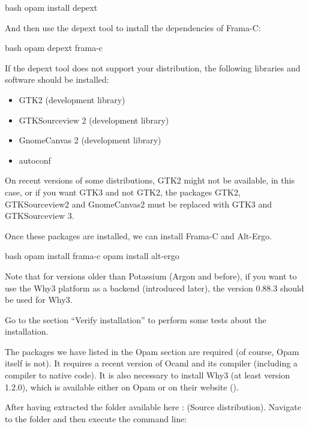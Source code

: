 \begin{CodeBlock}{bash}
opam install depext
\end{CodeBlock}


And then use the depext tool to install the dependencies of Frama-C:


\begin{CodeBlock}{bash}
opam depext frama-c
\end{CodeBlock}


If the depext tool does not support your distribution, the following
libraries and software should be installed:

\begin{itemize}
\item GTK2 (development library)
\item GTKSourceview 2 (development library)
\item GnomeCanvas 2 (development library)
\item autoconf
\end{itemize}

On recent versions of some distributions, GTK2 might not be available, in
this case, or if you want GTK3 and not GTK2, the packages GTK2, GTKSourceview2
and GnomeCanvas2 must be replaced with GTK3 and GTKSourceview 3.


Once these packages are installed, we can install Frama-C and Alt-Ergo.


\begin{CodeBlock}{bash}
opam install frama-c
opam install alt-ergo
\end{CodeBlock}


Note that for versions older than Potassium (Argon and before), if you
want to use the Why3 platform as a backend (introduced later), the version
0.88.3 should be used for Why3.


Go to the section ``Verify installation'' to perform some tests about
the installation.





The packages we have listed in the Opam section are required (of course,
Opam itself is not). It requires a recent version of Ocaml and its
compiler (including a compiler to native code). It is also necessary to
install Why3 (at least version 1.2.0), which is available either on Opam
or on their website ().



After having extracted the folder available here :
 (Source distribution).
Navigate to the folder and then execute the command line:



